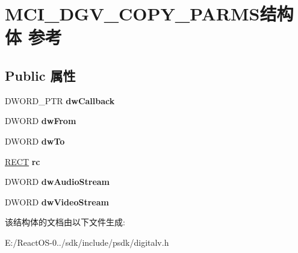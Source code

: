 \hypertarget{struct_m_c_i___d_g_v___c_o_p_y___p_a_r_m_s}{}\section{M\+C\+I\+\_\+\+D\+G\+V\+\_\+\+C\+O\+P\+Y\+\_\+\+P\+A\+R\+M\+S结构体 参考}
\label{struct_m_c_i___d_g_v___c_o_p_y___p_a_r_m_s}
\subsection*{Public 属性}
\begin{DoxyCompactItemize}
\item 
\mbox{\label{struct_m_c_i___d_g_v___c_o_p_y___p_a_r_m_s_a13447b1ce7166a59c091d03ee250a3c3}} 
D\+W\+O\+R\+D\+\_\+\+P\+TR {\bfseries dw\+Callback}
\item 
\mbox{\label{struct_m_c_i___d_g_v___c_o_p_y___p_a_r_m_s_a3d5f11229c0d6c69c2df0e6323e22aa6}} 
D\+W\+O\+RD {\bfseries dw\+From}
\item 
\mbox{\label{struct_m_c_i___d_g_v___c_o_p_y___p_a_r_m_s_a642c0a6b3af539a83ead4e532793235a}} 
D\+W\+O\+RD {\bfseries dw\+To}
\item 
\mbox{\label{struct_m_c_i___d_g_v___c_o_p_y___p_a_r_m_s_a0588b49db5770fdcf0ccc41d2667a1ca}} 
\hyperlink{structtag_r_e_c_t}{R\+E\+CT} {\bfseries rc}
\item 
\mbox{\label{struct_m_c_i___d_g_v___c_o_p_y___p_a_r_m_s_a6a462c81a7a528e01cdd199d5dfbe735}} 
D\+W\+O\+RD {\bfseries dw\+Audio\+Stream}
\item 
\mbox{\label{struct_m_c_i___d_g_v___c_o_p_y___p_a_r_m_s_a47a589df43de2bb93faf7d963a65a6c5}} 
D\+W\+O\+RD {\bfseries dw\+Video\+Stream}
\end{DoxyCompactItemize}


该结构体的文档由以下文件生成\+:\begin{DoxyCompactItemize}
\item 
E\+:/\+React\+O\+S-\/0../sdk/include/psdk/digitalv.\+h\end{DoxyCompactItemize}

